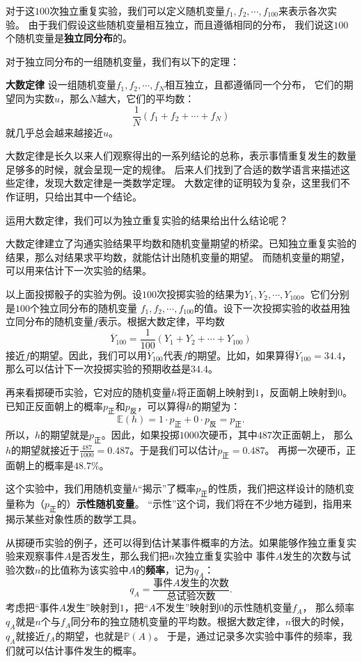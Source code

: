 \documentclass[12pt,UTF8]{ctexbook}
\begin{document}
对于这$100$次独立重复实验，我们可以定义随机变量$f_1,f_2,\cdots , f_{100}$来表示各次实验。
由于我们假设这些随机变量相互独立，而且遵循相同的分布，
我们说这$100$个随机变量是\textbf{独立同分布}的。

对于独立同分布的一组随机变量，我们有以下的定理：
\begin{tm}\textbf{大数定律}
    设一组随机变量$f_1, f_2, \cdots, f_{N}$相互独立，且都遵循同一个分布，
    它们的期望同为实数$u$，那么$N$越大，它们的平均数：
    $$\frac{1}{N}\left(f_1 + f_2 + \cdots + f_{N}\right)$$
    就几乎总会越来越接近$u$。
\end{tm}

大数定律是长久以来人们观察得出的一系列结论的总称，表示事情重复发生的数量足够多的时候，就会呈现一定的规律。
后来人们找到了合适的数学语言来描述这些定律，发现大数定律是一类数学定理。
大数定律的证明较为复杂，这里我们不作证明，只给出其中一个结论。

运用大数定律，我们可以为独立重复实验的结果给出什么结论呢？

大数定律建立了沟通实验结果平均数和随机变量期望的桥梁。已知独立重复实验的结果，那么对结果求平均数，就能估计出随机变量的期望。
而随机变量的期望，可以用来估计下一次实验的结果。

以上面投掷骰子的实验为例。设$100$次投掷实验的结果为$Y_1, Y_2, \cdots , Y_{100}$。它们分别是$100$个独立同分布的随机变量
$f_1, f_2, \cdots, f_{100}$的值。设下一次投掷实验的收益用独立同分布的随机变量$f$表示。根据大数定律，平均数
$$\overline{Y}_{100} = \frac{1}{100}(Y_1 + Y_2 + \cdots + Y_{100})$$
接近$f$的期望。因此，我们可以用$\overline{Y}_{100}$代表$f$的期望。比如，如果算得$\overline{Y}_{100} = 34.4$，
那么可以估计下一次投掷实验的预期收益是$34.4$。

再来看掷硬币实验，它对应的随机变量$h$将正面朝上映射到$1$，反面朝上映射到$0$。
已知正反面朝上的概率$p_{\text{正}}$和$p_{\text{反}}$，可以算得$h$的期望为：
$$ \mathbb{E}(h) = 1 \cdot p_{\text{正}} + 0 \cdot p_{\text{反}} = p_{\text{正}}.$$
所以，$h$的期望就是$p_{\text{正}}$。因此，如果投掷$1000$次硬币，其中$487$次正面朝上，
那么$h$的期望就接近于$\frac{487}{1000} = 0.487$。于是我们可以估计$p_{\text{正}} = 0.487$。
再掷一次硬币，正面朝上的概率是$48.7\%$。

这个实验中，我们用随机变量$h$“揭示”了概率$p_{\text{正}}$的性质，我们把这样设计的随机变量称为（$p_{\text{正}}$的）\textbf{示性随机变量}。
“示性”这个词，我们将在不少地方碰到，指用来揭示某些对象性质的数学工具。

从掷硬币实验的例子，还可以得到估计某事件概率的方法。如果能够作独立重复实验来观察事件$A$是否发生，那么我们把$n$次独立重复实验中
事件$A$发生的次数与试验次数$n$的比值称为该实验中$A$的\textbf{频率}，记为$q_A$：
$$ q_A = \frac{\mbox{事件}A\mbox{发生的次数}}{\mbox{总试验次数}}.$$
考虑把“事件$A$发生”映射到$1$，把“$A$不发生”映射到$0$的示性随机变量$f_A$，
那么频率$q_A$就是$n$个与$f_A$同分布的独立随机变量的平均数。根据大数定律，$n$很大的时候，$q_A$就接近$f_A$的期望，也就是$\mathbb{P}(A)$。
于是，通过记录多次实验中事件的频率，我们就可以估计事件发生的概率。
\end{document}
